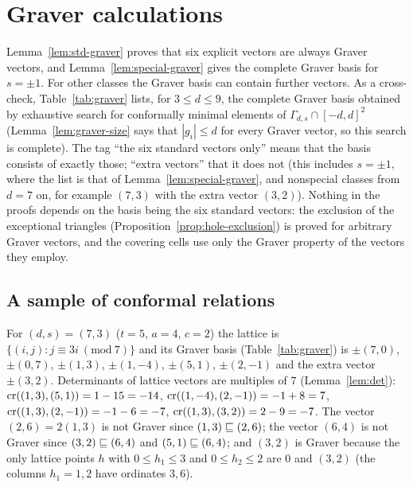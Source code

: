 \section{Graver calculations}\label{app:graver}

Lemma~\ref{lem:std-graver} proves that six explicit vectors are always Graver vectors, and Lemma~\ref{lem:special-graver} gives the complete Graver basis for $s=\pm1$. For other classes the Graver basis can contain further vectors. As a cross-check, Table~\ref{tab:graver} lists, for $3\le d\le9$, the complete Graver basis obtained by exhaustive search for conformally minimal elements of $\Gamma_{d,s}\cap[-d,d]^2$ (Lemma~\ref{lem:graver-size} says that $|g_i|\le d$ for every Graver vector, so this search is complete). The tag ``the six standard vectors only'' means that the basis consists of exactly those; ``extra vectors'' that it does not (this includes $s=\pm1$, where the list is that of Lemma~\ref{lem:special-graver}, and nonspecial classes from $d=7$ on, for example $(7,3)$ with the extra vector $(3,2)$). Nothing in the proofs depends on the basis being the six standard vectors: the exclusion of the exceptional triangles (Proposition~\ref{prop:hole-exclusion}) is proved for arbitrary Graver vectors, and the covering cells use only the Graver property of the vectors they employ.



\subsection{A sample of conformal relations}

For $(d,s)=(7,3)$ ($t=5$, $a=4$, $c=2$) the lattice is $\{(i,j):j\equiv3i\ (\mathrm{mod}\ 7)\}$ and its Graver basis (Table~\ref{tab:graver}) is $\pm(7,0)$, $\pm(0,7)$, $\pm(1,3)$, $\pm(1,-4)$, $\pm(5,1)$, $\pm(2,-1)$ and the extra vector $\pm(3,2)$. Determinants of lattice vectors are multiples of $7$ (Lemma~\ref{lem:det}): $\operatorname{cr}((1,3),(5,1))=1-15=-14$, $\operatorname{cr}((1,-4),(2,-1))=-1+8=7$, $\operatorname{cr}((1,3),(2,-1))=-1-6=-7$, $\operatorname{cr}((1,3),(3,2))=2-9=-7$. The vector $(2,6)=2(1,3)$ is not Graver since $(1,3)\sqsubseteq(2,6)$; the vector $(6,4)$ is not Graver since $(3,2)\sqsubseteq(6,4)$ and $(5,1)\sqsubseteq(6,4)$; and $(3,2)$ is Graver because the only lattice points $h$ with $0\le h_1\le3$ and $0\le h_2\le2$ are $0$ and $(3,2)$ (the columns $h_1=1,2$ have ordinates $3,6$).

